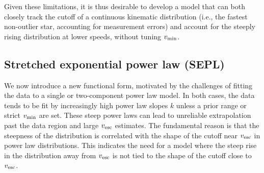 Given these limitations, it is thus desirable to develop a model that can both closely track the cutoff of a continuous kinematic distribution (i.e., the fastest non-outlier star, accounting for measurement errors) and account for the steeply rising distribution at lower speeds, without tuning $v_{\rm{min}}$. 

\subsection{Stretched exponential power law (SEPL)}
\label{sec:sepl}

We now introduce a new functional form, motivated by the challenges of fitting the data to a single or two-component power law model. In both cases, the data tends to be fit by increasingly high power law slopes $k$ unless a prior range or strict $v_{\rm{min}}$ are set.  These steep power laws can lead to unreliable extrapolation past the data region and large $v_{\rm{esc}}$ estimates. The fundamental reason is that the steepness of the distribution is correlated with the shape of the cutoff near $v_{\rm{esc}}$ in power law distributions.  This indicates the need for a model where the steep rise in the distribution away from $v_{\rm{esc}}$ is not tied to the shape of the cutoff close to $v_{\rm{esc}}$.

